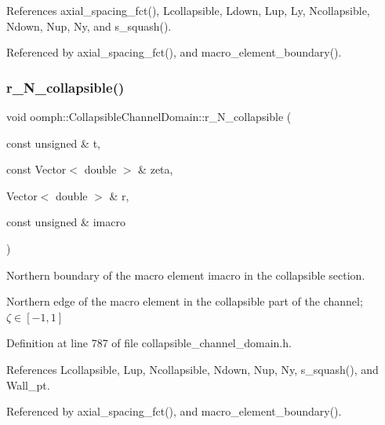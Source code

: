References axial\+\_\+spacing\+\_\+fct(), Lcollapsible, Ldown, Lup, Ly, Ncollapsible, Ndown, Nup, Ny, and s\+\_\+squash().



Referenced by axial\+\_\+spacing\+\_\+fct(), and macro\+\_\+element\+\_\+boundary().

\mbox{\label{classoomph_1_1CollapsibleChannelDomain_a0044d3e848b4c643a8a30f4f00a88e8d}} 
\subsubsection{\texorpdfstring{r\+\_\+\+N\+\_\+collapsible()}{r\_N\_collapsible()}}
{\footnotesize\ttfamily void oomph\+::\+Collapsible\+Channel\+Domain\+::r\+\_\+\+N\+\_\+collapsible (\begin{DoxyParamCaption}\item[{const unsigned \&}]{t,  }\item[{const Vector$<$ double $>$ \&}]{zeta,  }\item[{Vector$<$ double $>$ \&}]{r,  }\item[{const unsigned \&}]{imacro }\end{DoxyParamCaption})\hspace{0.3cm}{\ttfamily [private]}}



Northern boundary of the macro element imacro in the collapsible section. 

Northern edge of the macro element in the collapsible part of the channel; $ \zeta \in [-1,1] $ 

Definition at line 787 of file collapsible\+\_\+channel\+\_\+domain.\+h.



References Lcollapsible, Lup, Ncollapsible, Ndown, Nup, Ny, s\+\_\+squash(), and Wall\+\_\+pt.



Referenced by axial\+\_\+spacing\+\_\+fct(), and macro\+\_\+element\+\_\+boundary().

\mbox{\label{classoomph_1_1CollapsibleChannelDomain_aec5509d4e6a229da9fec78ceb78dcb18}} 
